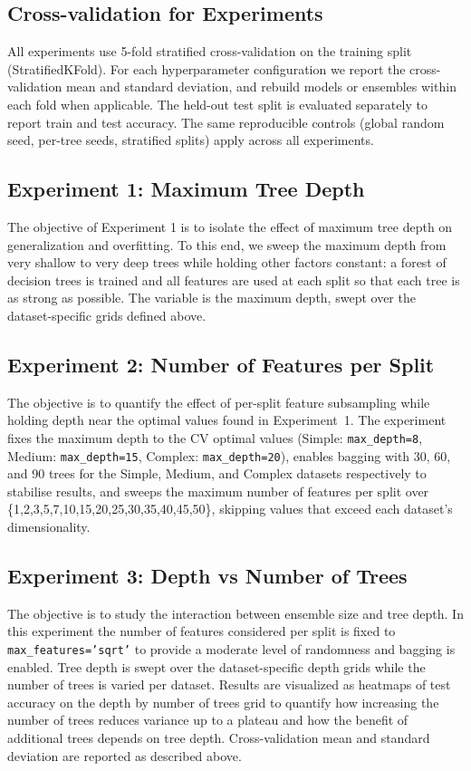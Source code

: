 \documentclass[conference]{IEEEtran}
\begin{document}
\subsection{Cross-validation for Experiments}
All experiments use 5-fold stratified cross-validation on the training split (StratifiedKFold). For each hyperparameter configuration we report the cross-validation mean and standard deviation, and rebuild models or ensembles within each fold when applicable. The held-out test split is evaluated separately to report train and test accuracy. The same reproducible controls (global random seed, per-tree seeds, stratified splits) apply across all experiments.

\subsection{Experiment 1: Maximum Tree Depth}
The objective of Experiment 1 is to isolate the effect of maximum tree depth on generalization and overfitting. To this end, we sweep the maximum depth from 
very shallow to very deep trees while holding other factors constant: a forest of decision trees is trained and all features are used at 
each split so that each tree is as strong as possible. The variable is the maximum depth, swept over the dataset-specific grids defined above.

\subsection{Experiment 2: Number of Features per Split}
The objective is to quantify the effect of per-split feature subsampling while holding depth near the optimal values found in Experiment~1. The experiment fixes the maximum depth to 
the CV optimal values (Simple: \texttt{max\_depth=8}, Medium: \texttt{max\_depth=15}, Complex: \texttt{max\_depth=20}), enables bagging with 30, 60, and 90 trees for the Simple, Medium, 
and Complex datasets respectively to stabilise results, and sweeps the maximum number of features per split over \{1,2,3,5,7,10,15,20,25,30,35,40,45,50\}, skipping values that 
exceed each dataset's dimensionality.
\subsection{Experiment 3: Depth vs Number of Trees}
The objective is to study the interaction between ensemble size and tree depth. In this experiment the number of features considered per split is fixed
 to \texttt{max\_features='sqrt'} to provide a moderate level of randomness and bagging is enabled. Tree depth is swept over the dataset-specific depth grids while the number of
  trees is varied per dataset. Results are visualized as heatmaps of test accuracy on the depth by number of trees grid to quantify how increasing the number of trees reduces variance up to a plateau and how the benefit of additional trees depends on tree depth. Cross-validation mean and standard deviation are reported as described above.
\end{document}
